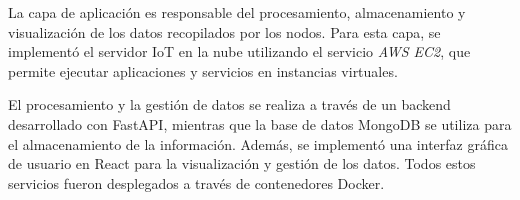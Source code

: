 La capa de aplicación es responsable del procesamiento, almacenamiento y
visualización de los datos recopilados por los nodos. Para esta capa, se
implementó el servidor IoT en la nube utilizando el servicio \textit{AWS EC2},
que permite ejecutar aplicaciones y servicios en instancias virtuales.

El procesamiento y la gestión de datos se realiza a través de un backend
desarrollado con FastAPI, mientras que la base de datos MongoDB se utiliza para
el almacenamiento de la información. Además, se implementó una interfaz gráfica
de usuario en React para la visualización y gestión de los datos. Todos estos
servicios fueron desplegados a través de contenedores Docker.






